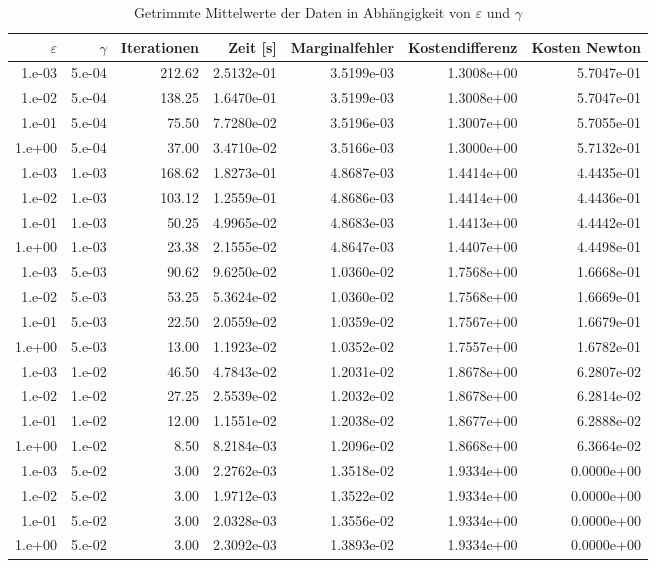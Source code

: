 \begin{table}[htbp]
\caption{Getrimmte Mittelwerte der Daten in Abhängigkeit von $\varepsilon$ und $\gamma$}
\label{tab:Parametertest64}
\small
\centering
{}
\begin{tabular}{rrrrrrr}
\toprule
$\varepsilon$ & $\gamma$ & Iterationen & Zeit [s] & Marginalfehler & Kostendifferenz & Kosten Newton \\
\midrule
1.e-03 & 5.e-04 & 212.62 & 2.5132e-01 & 3.5199e-03 & 1.3008e+00 & 5.7047e-01 \\
1.e-02 & 5.e-04 & 138.25 & 1.6470e-01 & 3.5199e-03 & 1.3008e+00 & 5.7047e-01 \\
1.e-01 & 5.e-04 & 75.50 & 7.7280e-02 & 3.5196e-03 & 1.3007e+00 & 5.7055e-01 \\
1.e+00 & 5.e-04 & 37.00 & 3.4710e-02 & 3.5166e-03 & 1.3000e+00 & 5.7132e-01 \\
1.e-03 & 1.e-03 & 168.62 & 1.8273e-01 & 4.8687e-03 & 1.4414e+00 & 4.4435e-01 \\
1.e-02 & 1.e-03 & 103.12 & 1.2559e-01 & 4.8686e-03 & 1.4414e+00 & 4.4436e-01 \\
1.e-01 & 1.e-03 & 50.25 & 4.9965e-02 & 4.8683e-03 & 1.4413e+00 & 4.4442e-01 \\
1.e+00 & 1.e-03 & 23.38 & 2.1555e-02 & 4.8647e-03 & 1.4407e+00 & 4.4498e-01 \\
1.e-03 & 5.e-03 & 90.62 & 9.6250e-02 & 1.0360e-02 & 1.7568e+00 & 1.6668e-01 \\
1.e-02 & 5.e-03 & 53.25 & 5.3624e-02 & 1.0360e-02 & 1.7568e+00 & 1.6669e-01 \\
1.e-01 & 5.e-03 & 22.50 & 2.0559e-02 & 1.0359e-02 & 1.7567e+00 & 1.6679e-01 \\
1.e+00 & 5.e-03 & 13.00 & 1.1923e-02 & 1.0352e-02 & 1.7557e+00 & 1.6782e-01 \\
1.e-03 & 1.e-02 & 46.50 & 4.7843e-02 & 1.2031e-02 & 1.8678e+00 & 6.2807e-02 \\
1.e-02 & 1.e-02 & 27.25 & 2.5539e-02 & 1.2032e-02 & 1.8678e+00 & 6.2814e-02 \\
1.e-01 & 1.e-02 & 12.00 & 1.1551e-02 & 1.2038e-02 & 1.8677e+00 & 6.2888e-02 \\
1.e+00 & 1.e-02 & 8.50 & 8.2184e-03 & 1.2096e-02 & 1.8668e+00 & 6.3664e-02 \\
1.e-03 & 5.e-02 & 3.00 & 2.2762e-03 & 1.3518e-02 & 1.9334e+00 & 0.0000e+00 \\
1.e-02 & 5.e-02 & 3.00 & 1.9712e-03 & 1.3522e-02 & 1.9334e+00 & 0.0000e+00 \\
1.e-01 & 5.e-02 & 3.00 & 2.0328e-03 & 1.3556e-02 & 1.9334e+00 & 0.0000e+00 \\
1.e+00 & 5.e-02 & 3.00 & 2.3092e-03 & 1.3893e-02 & 1.9334e+00 & 0.0000e+00 \\
\bottomrule
\end{tabular}
\end{table}

